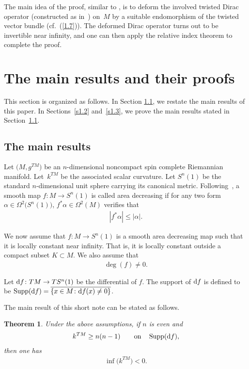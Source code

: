 \documentclass[10pt,a4paper]{amsart}
\numberwithin{equation}{section}
\newtheorem{thm}{Theorem}[section]
\theoremstyle{definition}
\begin{document}
The main idea of the proof, similar to \cite[equation~(1.11)]{Z19}, is to deform the involved twisted Dirac operator (constructed as in~\cite{L98})
on~$M$ by a suitable endomorphism of the twisted vector bundle (cf.~(\ref{1.7})). The deformed Dirac operator turns out to be invertible near infinity, and one can then apply the relative index theorem to complete the proof.

\section{The main results and their proofs}\label{s1}

This section is organized as follows. In Section \ref{s1.1}, we restate the main results of this paper. In Sections~\ref{s1.2} and~\ref{s1.3}, we prove the main results stated in Section~\ref{s1.1}.

\subsection{The main results}\label{s1.1}

Let $\big(M,g^{TM}\big)$ be an $n$-dimensional noncompact spin complete Riemannian manifold. Let~$k^{TM}$ be the associated scalar curvature. Let $S^n(1)$ be the standard $n$-dimensional unit sphere carrying its canonical metric. Following~\cite{GL83}, a smooth map $f\colon M \rightarrow S^n(1)$ is called area decreasing if for any two form $\alpha\in\Omega^2\big(S^n(1)\big)$, $f^*\alpha\in\Omega^2(M)$ verifies that
\begin{gather}\label{1.1}
|f^*\alpha|\leq |\alpha|.
\end{gather}

We now assume that $f\colon M\rightarrow S^n(1)$ is a smooth area decreasing map such that it is locally constant near infinity. That is, it is locally constant outside a compact subset $K\subset M$. We also assume that
\begin{gather}\label{1.2}
\deg (f)\neq 0.
\end{gather}

Let ${\rm d}f\colon TM\rightarrow TS^n(1)$ be the differential of $f$. The support of ${\rm d}f$ is defined to be $\operatorname{Supp}({\rm d}f)=\overline{\{ x\in M\colon {\rm d}f(x)\neq 0\}}$.

The main result of this short note can be stated as follows.

\begin{thm}\label{t1.1} Under the above assumptions, if $n$ is even and
\begin{gather}\label{1.3}
k^{TM}\geq n(n-1) \qquad {\rm on}\quad \operatorname{Supp}({\rm d}f),
\end{gather}
then one has
\begin{gather}\label{1.4}
\inf \big(k^{TM}\big)<0.
\end{gather}
\end{thm}
\end{document}
